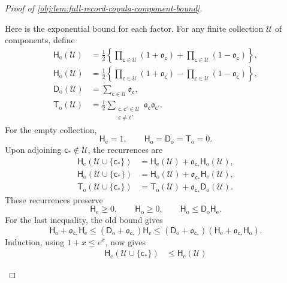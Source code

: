 \documentclass[11pt]{article}
\begin{document}
\begin{proof}[Proof of \cref{obj:lem:full-record-copula-component-bound}]
\begin{enumerate}
Here is the exponential bound for each factor. For any finite collection
\(\mathscr U\) of components, define
\[
\begin{aligned}
\mathsf H_{\mathrm e}(\mathscr U)
 &=\frac12\left\{
   \prod_{\mathsf c\in\mathscr U}(1+\mathfrak o_{\mathsf c})
   +\prod_{\mathsf c\in\mathscr U}(1-\mathfrak o_{\mathsf c})
   \right\},\\
\mathsf H_{\mathrm o}(\mathscr U)
 &=\frac12\left\{
   \prod_{\mathsf c\in\mathscr U}(1+\mathfrak o_{\mathsf c})
   -\prod_{\mathsf c\in\mathscr U}(1-\mathfrak o_{\mathsf c})
   \right\},\\
\mathsf D_{\mathrm o}(\mathscr U)
 &=\sum_{\mathsf c\in\mathscr U}\mathfrak o_{\mathsf c},\\
\mathsf T_{\mathrm o}(\mathscr U)
 &=\frac12\sum_{\substack{\mathsf c,\mathsf c'\in\mathscr U\\
                         \mathsf c\ne\mathsf c'}}
      \mathfrak o_{\mathsf c}\mathfrak o_{\mathsf c'}.
\end{aligned}
\]
For the empty collection,
\[
\mathsf H_{\mathrm e}=1,\qquad
\mathsf H_{\mathrm o}=\mathsf D_{\mathrm o}
 =\mathsf T_{\mathrm o}=0.
\]
Upon adjoining \(\mathsf c_*\notin\mathscr U\), the recurrences are
\[
\begin{aligned}
\mathsf H_{\mathrm e}(\mathscr U\cup\{\mathsf c_*\})
 &=\mathsf H_{\mathrm e}(\mathscr U)
   +\mathfrak o_{\mathsf c_*}\mathsf H_{\mathrm o}(\mathscr U),\\
\mathsf H_{\mathrm o}(\mathscr U\cup\{\mathsf c_*\})
 &=\mathsf H_{\mathrm o}(\mathscr U)
   +\mathfrak o_{\mathsf c_*}\mathsf H_{\mathrm e}(\mathscr U),\\
\mathsf T_{\mathrm o}(\mathscr U\cup\{\mathsf c_*\})
 &=\mathsf T_{\mathrm o}(\mathscr U)
   +\mathfrak o_{\mathsf c_*}\mathsf D_{\mathrm o}(\mathscr U).
\end{aligned}
\]
These recurrences preserve
\[
\mathsf H_{\mathrm e}\ge0,\qquad
\mathsf H_{\mathrm o}\ge0,\qquad
\mathsf H_{\mathrm o}
 \le\mathsf D_{\mathrm o}\mathsf H_{\mathrm e}.
\]
For the last inequality, the old bound gives
\[
\mathsf H_{\mathrm o}
 +\mathfrak o_{\mathsf c_*}\mathsf H_{\mathrm e}
 \le
 (\mathsf D_{\mathrm o}+\mathfrak o_{\mathsf c_*})
 \mathsf H_{\mathrm e}
 \le
 (\mathsf D_{\mathrm o}+\mathfrak o_{\mathsf c_*})
 (\mathsf H_{\mathrm e}
   +\mathfrak o_{\mathsf c_*}\mathsf H_{\mathrm o}).
\]
Induction, using \(1+x\le e^x\), now gives
\[
\begin{aligned}
\mathsf H_{\mathrm e}(\mathscr U\cup\{\mathsf c_*\})
 &\le
 \mathsf H_{\mathrm e}(\mathscr U)

\end{aligned}\]
\end{enumerate}
\end{proof}
\end{document}
